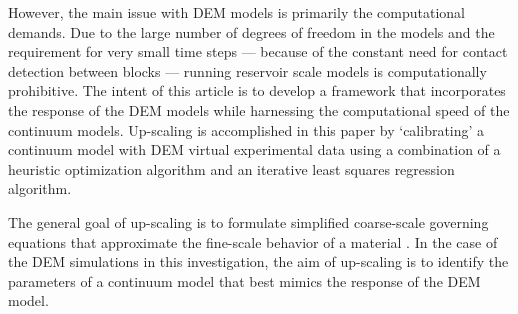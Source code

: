 However, the main issue with DEM models is primarily the computational demands. Due to the large number of degrees of freedom in the models and the requirement for very small time steps — because of the constant need for contact detection between blocks — running reservoir scale models is computationally prohibitive. The intent of this article is to develop a framework that incorporates the response of the DEM models while harnessing the computational speed of the continuum models. Up-scaling is accomplished in this paper by ‘calibrating’ a continuum model with DEM virtual experimental data using a combination of a heuristic optimization algorithm and an iterative least squares regression algorithm.

The general goal of up-scaling is to formulate simplified coarse-scale governing equations that approximate the fine-scale behavior of a material \citep{Geers_2010}. In the case of the DEM simulations in this investigation, the aim of up-scaling is to identify the parameters of a continuum model that best mimics the response of the DEM model.


